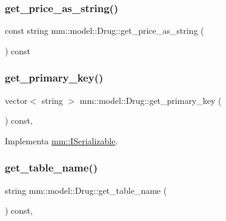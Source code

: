 \subsubsection{\texorpdfstring{get\+\_\+price\+\_\+as\+\_\+string()}{get\_price\_as\_string()}}
{\footnotesize\ttfamily const string mm\+::model\+::\+Drug\+::get\+\_\+price\+\_\+as\+\_\+string (\begin{DoxyParamCaption}{ }\end{DoxyParamCaption}) const}

\mbox{\label{classmm_1_1model_1_1_drug_a019770ab95f95f34bbc204c4c3860bfa}} 
\subsubsection{\texorpdfstring{get\+\_\+primary\+\_\+key()}{get\_primary\_key()}}
{\footnotesize\ttfamily vector$<$ string $>$ mm\+::model\+::\+Drug\+::get\+\_\+primary\+\_\+key (\begin{DoxyParamCaption}{ }\end{DoxyParamCaption}) const\hspace{0.3cm}{\ttfamily [override]}, {\ttfamily [virtual]}}



Implementa \mbox{\hyperlink{classmm_1_1_i_serializable_a69c0c514e11e386b6cb1fbd03f14da17}{mm\+::\+I\+Serializable}}.

\mbox{\label{classmm_1_1model_1_1_drug_a7fa9dbb569b89f397d4b865b778b3751}} 
\subsubsection{\texorpdfstring{get\+\_\+table\+\_\+name()}{get\_table\_name()}}
{\footnotesize\ttfamily string mm\+::model\+::\+Drug\+::get\+\_\+table\+\_\+name (\begin{DoxyParamCaption}{ }\end{DoxyParamCaption}) const\hspace{0.3cm}{\ttfamily [override]}, {\ttfamily [virtual]}}



